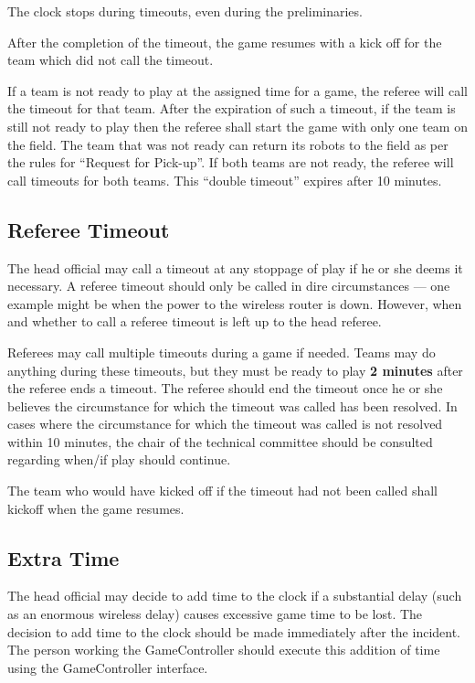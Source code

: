 \documentclass[12pt]{article}
\begin{document}
The clock stops during timeouts, even during the preliminaries.

After the completion of the timeout, the game resumes with a kick off for the team which did not call the timeout.

If a team is not ready to play at the assigned time for a game, the referee will call the timeout for that team. After the expiration of such a timeout, if the team is still not ready to play then the referee shall start the game with only one team on the field.  The team that was not ready can return its robots to the field as per the rules for ``Request for Pick-up''. If both teams are not ready, the referee will call timeouts for both teams. This ``double timeout'' expires after 10 minutes.

\subsection{Referee Timeout}
\label{sec:referee_timeout}
The head official may call a timeout at any stoppage of play if he or she deems it necessary.  A referee timeout should only be called in dire circumstances --- one example might be when the power to the wireless router is down.  However, when and whether to call a referee timeout is left up to the head referee.

Referees may call multiple timeouts during a game if needed.  Teams may do anything during these timeouts, but they must be ready to play \textbf{2 minutes} after the referee ends a timeout.  The referee should end the timeout once he or she believes the circumstance for which the timeout was called has been resolved.  In cases where the circumstance for which the timeout was called is not resolved within 10 minutes, the chair of the technical committee should be consulted regarding when/if play should continue.

The team who would have kicked off if the timeout had not been called shall kickoff when the game resumes.

\subsection{Extra Time}
\label{sec:extra_time}
The head official may decide to add time to the clock if a substantial delay (such as an enormous wireless delay) causes excessive game time to be lost.  The decision to add time to the clock should be made immediately after the incident.  The person working the GameController should execute this addition of time using the GameController interface.
\end{document}
